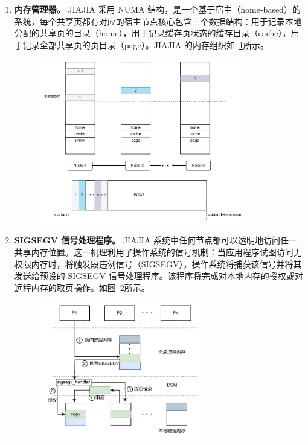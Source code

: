 {\begin{enumerate}[label=\arabic*.]
        \item \textbf{内存管理器。} JIAJIA 采用 NUMA 结构，是一个基于宿主（home-based）的系统，每个共享页都有对应的宿主节点核心包含三个数据结构：用于记录本地分配的共享页的目录（home），用于记录缓存页状态的缓存目录（cache），用于记录全部共享页的页目录（page）。JIAJIA 的内存组织如~\ref{fig:JIAJIA-memory}所示。
              \begin{figure}[!htbp]
                  \centering
                  \includegraphics[width=0.86\textwidth]{Img/JIAJIA内存组织.drawio.pdf}
                  \label{fig:JIAJIA-memory}
              \end{figure}

        \item \textbf{SIGSEGV 信号处理程序。} JIAJIA 系统中任何节点都可以透明地访问任一共享内存位置。这一机理利用了操作系统的信号机制：当应用程序试图访问无权限内存时，将触发段违例信号（SIGSEGV），操作系统将捕获该信号并将其发送给预设的 SIGSEGV 信号处理程序。该程序将完成对本地内存的授权或对远程内存的取页操作。如图~\ref{fig:JIAJIA-access}所示。
              \begin{figure}[!htbp]
                  \centering
                  \includegraphics[width=0.68\textwidth]{Img/JIAJIA访问远端内存.drawio.pdf}
                  \label{fig:JIAJIA-access}
              \end{figure}


\end{enumerate}}
